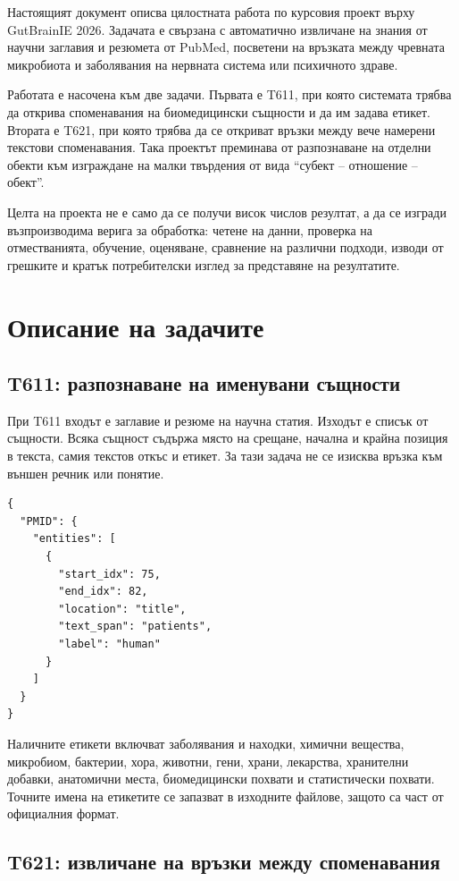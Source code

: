 \documentclass[12pt,a4paper]{article}
\begin{document}
Настоящият документ описва цялостната работа по курсовия проект върху GutBrainIE 2026. Задачата е свързана с автоматично извличане на знания от научни заглавия и резюмета от PubMed, посветени на връзката между чревната микробиота и заболявания на нервната система или психичното здраве.

Работата е насочена към две задачи. Първата е T611, при която системата трябва да открива споменавания на биомедицински същности и да им задава етикет. Втората е T621, при която трябва да се откриват връзки между вече намерени текстови споменавания. Така проектът преминава от разпознаване на отделни обекти към изграждане на малки твърдения от вида ``субект -- отношение -- обект''.

Целта на проекта не е само да се получи висок числов резултат, а да се изгради възпроизводима верига за обработка: четене на данни, проверка на отместванията, обучение, оценяване, сравнение на различни подходи, изводи от грешките и кратък потребителски изглед за представяне на резултатите.

\section{Описание на задачите}

\subsection{T611: разпознаване на именувани същности}

При T611 входът е заглавие и резюме на научна статия. Изходът е списък от същности. Всяка същност съдържа място на срещане, начална и крайна позиция в текста, самия текстов откъс и етикет. За тази задача не се изисква връзка към външен речник или понятие.

\begin{verbatim}
{
  "PMID": {
    "entities": [
      {
        "start_idx": 75,
        "end_idx": 82,
        "location": "title",
        "text_span": "patients",
        "label": "human"
      }
    ]
  }
}
\end{verbatim}

Наличните етикети включват заболявания и находки, химични вещества, микробиом, бактерии, хора, животни, гени, храни, лекарства, хранителни добавки, анатомични места, биомедицински похвати и статистически похвати. Точните имена на етикетите се запазват в изходните файлове, защото са част от официалния формат.

\subsection{T621: извличане на връзки между споменавания}
\end{document}
